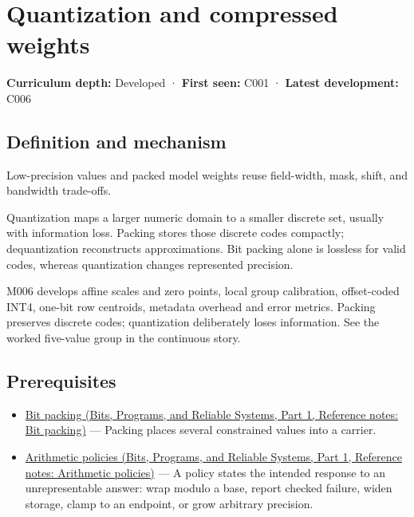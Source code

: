 \hypertarget{appendix-fdc7879e8bf2}{}\label{referencestart:appendix-fdc7879e8bf2}
\section{Quantization and compressed weights}\label{appendix-fdc7879e8bf2-quantization-and-compressed-weights}

\hypertarget{appendix-fdc7879e8bf2-quantization-and-compressed-weights}{}

\textbf{Curriculum depth:} Developed · \textbf{First seen:} C001 · \textbf{Latest development:} C006

\begin{allmightroledefinition}

\subsection{Definition and mechanism}\label{appendix-fdc7879e8bf2-definition-and-mechanism}

\hypertarget{appendix-fdc7879e8bf2-definition-and-mechanism}{}

Low-precision values and packed model weights reuse field-width, mask, shift, and bandwidth trade-offs.

\end{allmightroledefinition}

Quantization maps a larger numeric domain to a smaller discrete set, usually with information loss. Packing stores those discrete codes compactly; dequantization reconstructs approximations. Bit packing alone is lossless for valid codes, whereas quantization changes represented precision.

M006 develops affine scales and zero points, local group calibration, offset-coded INT4, one-bit row centroids, metadata overhead and error metrics. Packing preserves discrete codes; quantization deliberately loses information. See the worked five-value group in the continuous story.

\subsection{Prerequisites}\label{appendix-fdc7879e8bf2-prerequisites}

\hypertarget{appendix-fdc7879e8bf2-prerequisites}{}

\begin{itemize}
\tightlist
\item
  \href{../01-Bits-Programs-and-Reliable-Systems-P01/main.pdf\#nameddest=appendix-1f9963e1a5d1}{Bit packing (Bits, Programs, and Reliable Systems, Part 1, Reference notes: Bit packing)} --- Packing places several constrained values into a carrier.
\item
  \href{../01-Bits-Programs-and-Reliable-Systems-P01/main.pdf\#nameddest=appendix-2ed044358b82}{Arithmetic policies (Bits, Programs, and Reliable Systems, Part 1, Reference notes: Arithmetic policies)} --- A policy states the intended response to an unrepresentable answer: wrap modulo a base, report checked failure, widen storage, clamp to an endpoint, or grow arbitrary precision.
\end{itemize}

